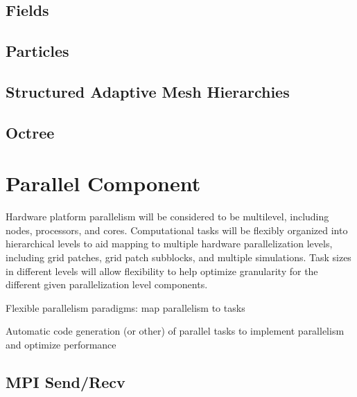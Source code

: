\subsection{Fields}

\subsection{Particles}

\subsection{Structured Adaptive Mesh Hierarchies}

\subsection{Octree}

\section{Parallel Component}

Hardware platform parallelism will be considered to be multilevel,
including nodes, processors, and cores.  Computational tasks will be
flexibly organized into hierarchical levels to aid mapping to multiple
hardware parallelization levels, including grid patches, grid patch
subblocks, and multiple simulations.  Task sizes in different levels
will allow flexibility to help optimize granularity for the different
given parallelization level components.

Flexible parallelism paradigms: map parallelism to tasks

Automatic code generation (or other) of parallel tasks to implement
parallelism and optimize performance

\subsection{MPI Send/Recv}

